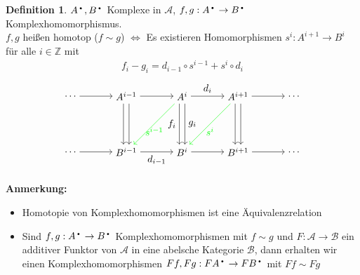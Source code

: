 \documentclass[10pt,a4paper,numbers=endperiod]{scrreprt}
\theoremstyle{definition}
\newtheorem{defi}[satz]{Definition}
\newcommand{\point}{\text{\textbullet}}
\def\ZZ{{\mathbb Z}}
\begin{document}
\begin{defi}
	$A^\point, B^\point$ Komplexe in $\mathcal{A}$, $f,g : A^\point \to B^\point$ Komplexhomomorphismus.\\
	$f, g$ heißen homotop ($f \sim g$) $\Leftrightarrow$ Es existieren Homomorphismen $s^i: A^{i+1} \to B^i$ für alle $i \in \ZZ$ mit \begin{align*}
		f_i - g_i = d_{i-1} \circ s^{i-1} + s^i \circ d_i
	\end{align*} \begin{align*}
	\begin{tikzpicture}{
	\node (30) at (1,2) {$ \ldots $};
	\node (31) at (3,2) {$ A^{i-1} $};
	\node (32) at (5,2) {$ A^i $};
	\node (33) at (7,2) {$ A^{i+1} $};
	\node (34) at (9,2) {$ \ldots $};
	\node (40) at (1,0) {$ \ldots $};
	\node (41) at (3,0) {$ B^{i-1} $};
	\node (42) at (5,0) {$ B^i $};
	\node (43) at (7,0) {$ B^{i+1} $};
	\node (44) at (9,0) {$ \ldots $};
	\draw[->] (30) edge (31);
	\draw[->] (31) edge (32);
	\draw[->] (32) edge node[above] {$d_i$} (33);
	\draw[->] (33) edge (34);
	\draw[->] ([xshift= 1* 0.1 cm]31.south) -- ([xshift= 1* 0.1cm]41.north);
	\draw[->] ([xshift=-1* 0.1 cm]31.south) -- ([xshift= -1* 0.1cm]41.north);
	\draw[->] ([xshift= 1* 0.1 cm]32.south) -- node[right] {$g_i$} ([xshift= 1* 0.1cm]42.north);
	\draw[->] ([xshift=-1* 0.1 cm]32.south) -- node[left] {$f_i$} ([xshift= -1* 0.1cm]42.north);
	\draw[->] ([xshift= 1* 0.1 cm]33.south) -- ([xshift= 1* 0.1cm]43.north);
	\draw[->] ([xshift=-1* 0.1 cm]33.south) -- ([xshift= -1* 0.1cm]43.north);
	\draw[green][->] (32) edge node[below] {$s^{i-1}$} (41);
	\draw[green][->] (33) edge node[below] {$s^i$} (42);
	\draw[->] (40) edge (41);
	\draw[->] (41) edge node[below] {$d_{i-1}$} (42);
	\draw[->] (42) edge (43);
	\draw[->] (43) edge (44);}	
	\end{tikzpicture}	
	\end{align*}
\end{defi}
\textbf{Anmerkung:} \begin{itemize}
	\item Homotopie von Komplexhomomorphismen ist eine Äquivalenzrelation
	\item Sind $f, g: A^\point \to B^\point$ Komplexhomomorphismen mit $f \sim g$ und $F: \mathcal{A} \to \mathcal{B}$ ein additiver Funktor von $\mathcal{A}$ in  eine abelsche Kategorie $\mathcal{B}$, dann erhalten wir einen Komplexhomomorphismen $Ff, Fg: FA^\point \to FB^\point$ mit $Ff \sim Fg$
\end{itemize}
\end{document}
